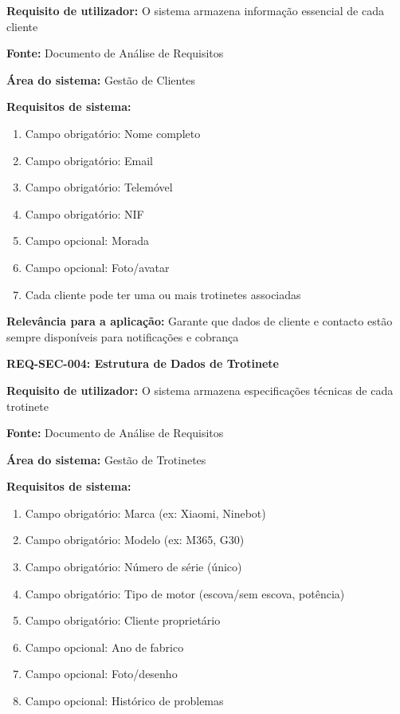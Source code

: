 \documentclass[11pt,a4paper]{article}
\newcommand{\reqheader}[1]{{\noindent\large\bfseries\color{sectionblue}#1}\par\vspace{0.3cm}}
\newcommand{\reqfield}[2]{{\noindent\textbf{#1:} #2}\par\vspace{0.2cm}}
\begin{document}
\reqfield{Requisito de utilizador}{O sistema armazena informação essencial de cada cliente}

\reqfield{Fonte}{Documento de Análise de Requisitos}

\reqfield{Área do sistema}{Gestão de Clientes}

\reqfield{Requisitos de sistema}{
	\begin{enumerate}
		\item Campo obrigatório: Nome completo
		\item Campo obrigatório: Email
		\item Campo obrigatório: Telemóvel
		\item Campo obrigatório: NIF
		\item Campo opcional: Morada
		\item Campo opcional: Foto/avatar
		\item Cada cliente pode ter uma ou mais trotinetes associadas
	\end{enumerate}
}

\reqfield{Relevância para a aplicação}{Garante que dados de cliente e contacto estão sempre disponíveis para notificações e cobrança}

\vspace{0.8cm}

\reqheader{REQ-SEC-004: Estrutura de Dados de Trotinete}

\reqfield{Requisito de utilizador}{O sistema armazena especificações técnicas de cada trotinete}

\reqfield{Fonte}{Documento de Análise de Requisitos}

\reqfield{Área do sistema}{Gestão de Trotinetes}

\reqfield{Requisitos de sistema}{
	\begin{enumerate}
		\item Campo obrigatório: Marca (ex: Xiaomi, Ninebot)
		\item Campo obrigatório: Modelo (ex: M365, G30)
		\item Campo obrigatório: Número de série (único)
		\item Campo obrigatório: Tipo de motor (escova/sem escova, potência)
		\item Campo obrigatório: Cliente proprietário
		\item Campo opcional: Ano de fabrico
		\item Campo opcional: Foto/desenho
		\item Campo opcional: Histórico de problemas
	\end{enumerate}
}
\end{document}

